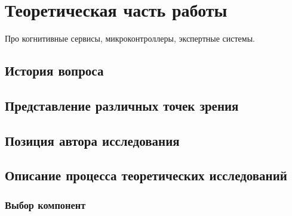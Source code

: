 \chapter{Теоретическая часть работы}

Про когнитивные сервисы, микроконтроллеры, экспертные системы.

\section{История вопроса}
\section{Представление различных точек зрения}
\section{Позиция автора исследования}
\section{Описание процесса теоретических исследований}
\subsection{Выбор компонент}
